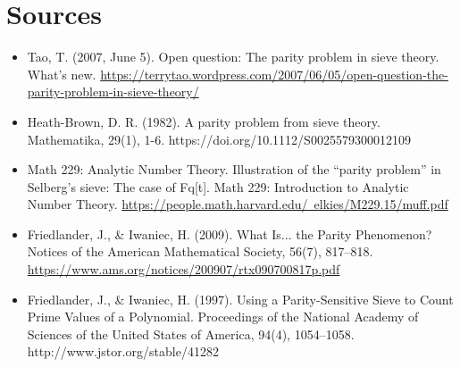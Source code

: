 \documentclass[8pt]{extarticle}
\begin{document}
\pagebreak
\section{Sources}
\begin{itemize}
  \item Tao, T. (2007, June 5). Open question: The parity problem in sieve theory. What's new. \href{https://terrytao.wordpress.com/2007/06/05/open-question-the-parity-problem-in-sieve-theory/}{https://terrytao.wordpress.com/2007/06/05/open-question-the-parity-problem-in-sieve-theory/}
  \item Heath-Brown, D. R. (1982). A parity problem from sieve theory. Mathematika, 29(1), 1-6. https://doi.org/10.1112/S0025579300012109
  \item Math 229: Analytic Number Theory. Illustration of the “parity problem” in Selberg’s sieve: The case of Fq[t]. Math 229: Introduction to Analytic Number Theory. \href{https://people.math.harvard.edu/~elkies/M229.15/muff.pdf}{https://people.math.harvard.edu/~elkies/M229.15/muff.pdf}
  \item Friedlander, J., \& Iwaniec, H. (2009). What Is... the Parity Phenomenon? Notices of the American Mathematical Society, 56(7), 817–818. \href{https://www.ams.org/notices/200907/rtx090700817p.pdf}{https://www.ams.org/notices/200907/rtx090700817p.pdf}
  \item Friedlander, J., \& Iwaniec, H. (1997). Using a Parity-Sensitive Sieve to Count Prime Values of a Polynomial. Proceedings of the National Academy of Sciences of the United States of America, 94(4), 1054–1058. http://www.jstor.org/stable/41282
  \end{itemize}
\end{document}
